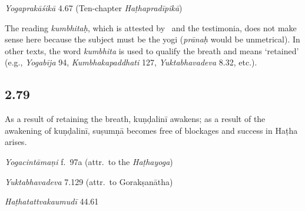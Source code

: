 \begin{ekdosis}
\begin{testimonia}[hp02_078]
\emph{Yogaprakāśikā} 4.67 (Ten-chapter \emph{Haṭhapradīpikā})

\begin{versinnote}
\end{versinnote}
\end{testimonia}

\begin{philcomm}[hp02_078]
The reading \emph{kumbhitaḥ}, which is attested by \alphaOne\ and the testimonia, does not make sense here because the subject must be the yogi (\emph{prānaḥ} would be unmetrical). In other texts, the word \emph{kumbhita} is used to qualify the breath and means `retained' (e.g., \emph{Yogabīja} 94, \emph{Kumbhakapaddhati} 127, \emph{Yuktabhavadeva} 8.32, etc.).
\end{philcomm}

\subsection*{2.79}
\begin{translation}[hp02_079]
As a result of retaining the breath, kuṇḍalinī awakens; as a result of the awakening of kuṇḍalinī, suṣumṇā becomes free of blockages and success in Haṭha arises.
\end{translation}

\begin{testimonia}[hp02_079]
\emph{Yogacintāmaṇi} f.~97a (attr.~to the \emph{Haṭhayoga})

\begin{versinnote}
\tl{anargalaḥ ] L, antargataḥ N\\!}
\end{versinnote}

\emph{Yuktabhavadeva} 7.129 (attr.~to Gorakṣanātha)

\begin{versinnote}
\end{versinnote}

\emph{Haṭhatattvakaumudī} 44.61


\end{testimonia}
\end{ekdosis}
